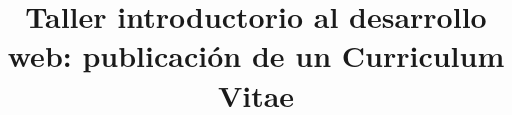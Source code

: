 \documentclass{article}
\begin{document}
\title{Taller introductorio al desarrollo web: publicación de un Curriculum Vitae}
\maketitle
\renewcommand*\contentsname{Contenido}
\end{document}
